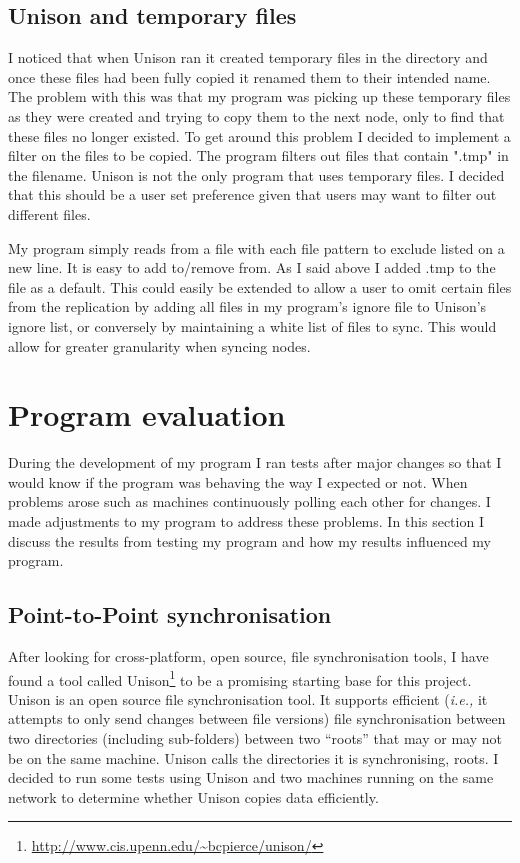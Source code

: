 \documentclass[12pt]{article}
\begin{document}
\subsection{Unison and temporary files}
\label{sec:uni_and_tmp}
I noticed that when Unison ran it created temporary files in the
directory and once these files had been fully copied it renamed
them to their intended name. The problem with this was that my program
was picking up these temporary files as they were created and trying to
copy them to the next node, only to find that these files no longer existed.
To get around this problem I decided to implement a filter on the files to
be copied. The program filters out files that contain ".tmp" in the filename.
Unison is not the only program that uses temporary files. I decided that this
should be a user set preference given that users may want to filter out different
files.

My program simply reads from a file with each file pattern to exclude
listed on a new line. It is easy to add to/remove from. As I said above
I added .tmp to the file as a default. This could easily be extended
to allow a user to omit certain files from the replication by adding
all files in my program's ignore file to Unison's ignore list, or conversely
by maintaining a white list of files to sync. This would allow for
greater granularity when syncing nodes.

\newpage
\section{Program evaluation}
During the development of my program I ran tests after major
changes so that I would know if the program was behaving the
way I expected or not.
When problems arose such as machines continuously polling each
other for changes. I made adjustments to my program to address
these problems.
In this section I discuss
the results from testing my program
and how my results influenced my program.

\subsection{Point-to-Point synchronisation}
\label{sec:point_to_point}
After looking for cross-platform, open source, file synchronisation
tools, I have found a tool called
Unison\footnote{\url{http://www.cis.upenn.edu/~bcpierce/unison/}}
to be a promising starting
base for this project. Unison is an open source file synchronisation tool.
It supports efficient (\emph{i.e.,} it attempts to only send changes between file versions) file synchronisation between two
directories (including sub-folders) between two ``roots''
that may or may not be on the same machine. Unison calls the
directories it is synchronising, roots.
I decided to run some tests using Unison 
and two machines running on the same network to 
determine whether Unison copies data efficiently.
\end{document}
